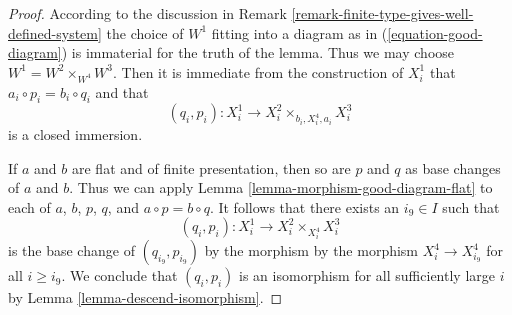 \documentclass{stacks-project}
\theoremstyle{plain}
\theoremstyle{definition}
\theoremstyle{remark}
\numberwithin{equation}{subsection}
\begin{document}
\begin{proof}
According to the discussion in
Remark \ref{remark-finite-type-gives-well-defined-system}
the choice of $W^1$ fitting into a diagram as in
(\ref{equation-good-diagram}) is immaterial for the truth of
the lemma. Thus we may choose $W^1 = W^2 \times_{W^4} W^3$.
Then it is immediate from the construction of $X^1_i$ that 
$a_i \circ p_i = b_i \circ q_i$ and that
$$
(q_i, p_i) : X^1_i \longrightarrow X^2_i \times_{b_i, X^4_i, a_i} X^3_i
$$
is a closed immersion.

\medskip\noindent
If $a$ and $b$ are flat and of finite presentation, then so are
$p$ and $q$ as base changes of $a$ and $b$. Thus we can apply
Lemma \ref{lemma-morphism-good-diagram-flat}
to each of $a$, $b$, $p$, $q$, and $a \circ p = b \circ q$.
It follows that there exists an $i_9 \in I$ such that
$$
(q_i, p_i) : X^1_i \to X^2_i \times_{X^4_i} X^3_i
$$
is the base change of $(q_{i_9}, p_{i_9})$ by the morphism
by the morphism $X^4_i \to X^4_{i_9}$ for all $i \geq i_9$.
We conclude that $(q_i, p_i)$ is an isomorphism for all sufficiently
large $i$ by Lemma \ref{lemma-descend-isomorphism}.
\end{proof}










\end{document}
